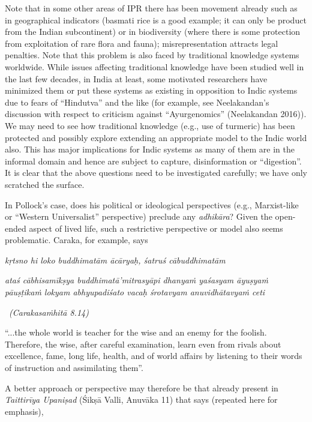 Note that in some other areas of IPR there has been movement already such as in geographical indicators (basmati rice is a good example; it can only be product from the Indian subcontinent) or in biodiversity (where there is some protection from exploitation of rare flora and fauna); misrepresentation attracts legal penalties. Note that this problem is also faced by traditional knowledge systems worldwide. While issues affecting traditional knowledge have been studied well in the last few decades, in India at least, some motivated researchers have minimized them or put these systems as existing in opposition to Indic systems due to fears of “Hindutva” and the like (for example, see Neelakandan’s discussion with respect to criticism against “Ayurgenomics” (Neelakandan 2016)).  We may need to see how traditional knowledge (e.g., use of turmeric) has been protected and possibly explore extending an appropriate model to the Indic world also. This has major implications for Indic systems as many of them are in the informal domain and hence are subject to capture, disinformation or “digestion”. It is clear that the above questions need to be investigated carefully; we have only scratched the surface.

In Pollock’s case, does his political or ideological perspectives (e.g., Marxist-like or “Western Universalist” perspective) preclude any {\sl adhikāra}? Given the open-ended aspect of lived life, such a restrictive perspective or model also seems problematic. Caraka, for example, says
\vskip -3pt

\begin{myquote}
{\sl kṛtsno hi loko buddhimatām ācāryaḥ, śatruś cābuddhimatām}

{\sl ataś cābhisamīkṣya buddhimatā’mitrasyāpi dhanyaṁ yaśasyam āyuṣyaṁ pāuṣṭikaṁ lokyam abhyupadiśato vacaḥ śrotavyam anuvidhātavyaṁ ceti}

~\hfill {\sl (Carakasaṁhitā 8.14)}

{\rm “...the whole world is teacher for the wise and an enemy for the foolish. Therefore, the wise, after careful examination, learn even from rivals about excellence, fame, long life, health, and of world affairs by listening to their words of instruction and assimilating them”.}
\end{myquote}
\vskip -3pt

A better approach or perspective may therefore be that already present in {\sl Taittirīya Upaniṣad} (Śikṣā Valli, Anuvāka 11) that says (repeated here for emphasis), 


